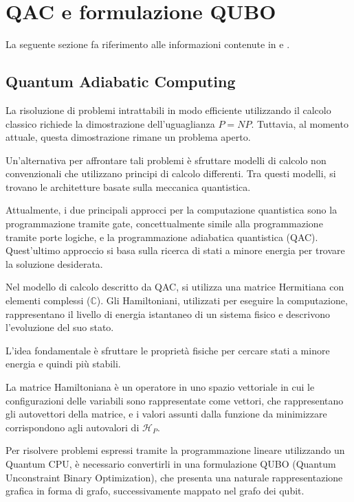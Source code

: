 \documentclass{article}
\begin{document}
\section{QAC e formulazione QUBO}
La seguente sezione fa riferimento alle informazioni contenute in \cite{MCGEOCH2020169} e \cite{DBLP:journals/corr/abs-1811-11538}.

\subsection{Quantum Adiabatic Computing}
La risoluzione di problemi intrattabili in modo efficiente utilizzando il calcolo classico richiede la dimostrazione dell'uguaglianza $P = NP$. Tuttavia, al momento attuale, questa dimostrazione rimane un problema aperto.

Un'alternativa per affrontare tali problemi è sfruttare modelli di calcolo non convenzionali che utilizzano principi di calcolo differenti. Tra questi modelli, si trovano le architetture basate sulla meccanica quantistica.

Attualmente, i due principali approcci per la computazione quantistica sono la programmazione tramite gate, concettualmente simile alla programmazione tramite porte logiche, e la programmazione adiabatica quantistica (QAC). Quest'ultimo approccio si basa sulla ricerca di stati a minore energia per trovare la soluzione desiderata.

Nel modello di calcolo descritto da QAC, si utilizza una matrice Hermitiana con elementi complessi ($\mathbb{C}$). Gli Hamiltoniani, utilizzati per eseguire la computazione, rappresentano il livello di energia istantaneo di un sistema fisico e descrivono l'evoluzione del suo stato.

L'idea fondamentale è sfruttare le proprietà fisiche per cercare stati a minore energia e quindi più stabili.

La matrice Hamiltoniana è un operatore in uno spazio vettoriale in cui le configurazioni delle variabili sono rappresentate come vettori, che rappresentano gli autovettori della matrice, e i valori assunti dalla funzione da minimizzare corrispondono agli autovalori di $\mathcal{H}_P$. 

Per risolvere problemi espressi tramite la programmazione lineare utilizzando un Quantum CPU, è necessario convertirli in una formulazione QUBO (Quantum Unconstraint Binary Optimization), che presenta una naturale rappresentazione grafica in forma di grafo, successivamente mappato nel grafo dei qubit.
\end{document}
